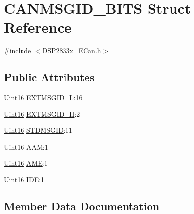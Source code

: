 \hypertarget{struct_c_a_n_m_s_g_i_d___b_i_t_s}{}\section{C\+A\+N\+M\+S\+G\+I\+D\+\_\+\+B\+I\+T\+S Struct Reference}
\label{struct_c_a_n_m_s_g_i_d___b_i_t_s}


{\ttfamily \#include $<$D\+S\+P2833x\+\_\+\+E\+Can.\+h$>$}

\subsection*{Public Attributes}
\begin{DoxyCompactItemize}
\item 
\hyperlink{_d_s_p2833x___device_8h_a59a9f6be4562c327cbfb4f7e8e18f08b}{Uint16} \hyperlink{struct_c_a_n_m_s_g_i_d___b_i_t_s_a571f6f47f818d54e3cb851dadee11cb1}{E\+X\+T\+M\+S\+G\+I\+D\+\_\+\+L}\+:16
\item 
\hyperlink{_d_s_p2833x___device_8h_a59a9f6be4562c327cbfb4f7e8e18f08b}{Uint16} \hyperlink{struct_c_a_n_m_s_g_i_d___b_i_t_s_ad01da1be62537ad95b05d81e3d92ce0c}{E\+X\+T\+M\+S\+G\+I\+D\+\_\+\+H}\+:2
\item 
\hyperlink{_d_s_p2833x___device_8h_a59a9f6be4562c327cbfb4f7e8e18f08b}{Uint16} \hyperlink{struct_c_a_n_m_s_g_i_d___b_i_t_s_a55c2da7e96ac75548f9d04529d776bad}{S\+T\+D\+M\+S\+G\+I\+D}\+:11
\item 
\hyperlink{_d_s_p2833x___device_8h_a59a9f6be4562c327cbfb4f7e8e18f08b}{Uint16} \hyperlink{struct_c_a_n_m_s_g_i_d___b_i_t_s_afd071a3231fe3f8e4a376db54b18bb7d}{A\+A\+M}\+:1
\item 
\hyperlink{_d_s_p2833x___device_8h_a59a9f6be4562c327cbfb4f7e8e18f08b}{Uint16} \hyperlink{struct_c_a_n_m_s_g_i_d___b_i_t_s_acfdfff276383ac891bcd7f5cb7bb5864}{A\+M\+E}\+:1
\item 
\hyperlink{_d_s_p2833x___device_8h_a59a9f6be4562c327cbfb4f7e8e18f08b}{Uint16} \hyperlink{struct_c_a_n_m_s_g_i_d___b_i_t_s_a777b15075c7a7a33296f2079f3618090}{I\+D\+E}\+:1
\end{DoxyCompactItemize}


\subsection{Member Data Documentation}
\hypertarget{struct_c_a_n_m_s_g_i_d___b_i_t_s_afd071a3231fe3f8e4a376db54b18bb7d}{}
